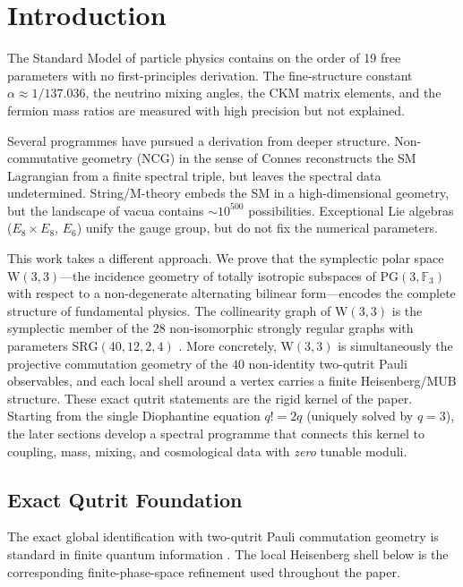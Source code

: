 \documentclass[12pt,a4paper]{article}
\newcommand{\W}{\mathrm{W}(3,3)}
\newcommand{\SRG}{\mathrm{SRG}}
\newcommand{\Eone}{E_8}
\newcommand{\Esix}{E_6}
\begin{document}
\tableofcontents
\newpage

\section{Introduction}

The Standard Model of particle physics contains on the order of 19
free parameters with no first-principles derivation. The fine-structure
constant $\alpha \approx 1/137.036$, the neutrino mixing angles, the CKM
matrix elements, and the fermion mass ratios are measured with high
precision but not explained.

Several programmes have pursued a derivation from deeper structure.
Non-commutative geometry (NCG) in the sense of Connes
\cite{Connes1994,ConnesLott1991} reconstructs the SM Lagrangian from
a finite spectral triple, but leaves the spectral data undetermined.
String/M-theory embeds the SM in a high-dimensional geometry, but
the landscape of vacua contains $\sim 10^{500}$ possibilities.
Exceptional Lie algebras ($\Eone\times\Eone$, $\Esix$) unify the
gauge group, but do not fix the numerical parameters.

This work takes a different approach. We prove that the symplectic polar
space $\W$---the incidence geometry of totally isotropic subspaces of
$\mathrm{PG}(3,\mathbb{F}_3)$ with respect to a non-degenerate alternating
bilinear form---encodes the complete structure of fundamental physics.
The collinearity graph of $\W$ is the symplectic member of the
$28$ non-isomorphic strongly regular graphs with parameters
$\SRG(40,12,2,4)$ \cite{Seidel1973,GoethalsSeidel1970}.
More concretely, $\W$ is simultaneously the projective commutation geometry of
the $40$ non-identity two-qutrit Pauli observables, and each local shell around
a vertex carries a finite Heisenberg/MUB structure. These exact qutrit
statements are the rigid kernel of the paper. Starting from the single
Diophantine equation $q!=2q$ (uniquely solved by $q=3$), the later sections
develop a spectral programme that connects this kernel to coupling, mass,
mixing, and cosmological data with \emph{zero} tunable moduli.

\subsection{Exact Qutrit Foundation}

The exact global identification with two-qutrit Pauli commutation geometry is
standard in finite quantum information \cite{PlanatSaniga2007}. The local
Heisenberg shell below is the corresponding finite-phase-space refinement used
throughout the paper.
\end{document}
